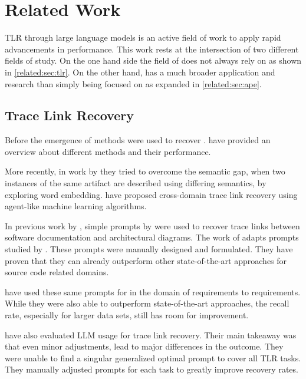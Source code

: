 \chapter{Related Work}
\Acl{TLR} through large language models is an active field of work to apply rapid advancements in \LLM performance.
This work rests at the intersection of two different fields of study.
On the one hand side the field of \TLR does not always rely on \LLMs as shown in \autoref{related:sec:tlr}.
On the other hand, \APE has a much broader application and research than simply being focused on \TLR as expanded in \autoref{related:sec:ape}.


\section{Trace Link Recovery}
\label{related:sec:tlr}

Before the emergence of \LLMs \IR methods were used to recover \TLs.
 have provided an overview about different \IR methods and their performance. 

More recently, in work by  they tried to overcome the semantic gap, when two instances of the same artifact are described using differing semantics, by exploring word embedding.
 have proposed cross-domain trace link recovery using agent-like machine learning algorithms. 



In previous work by , simple prompts by  were used to recover trace links between software documentation and architectural diagrams.
The work of \citeauthor{ewald2024RetrievalAugmentedLarge} adapts prompts studied by .
These prompts were manually designed and formulated.
They have proven that they can already outperform other state-of-the-art approaches for source code related \TLR domains.

 have used these same prompts for \TLR in the domain of requirements to requirements.
While they were also able to outperform state-of-the-art approaches, the recall rate, especially for larger data sets, still has room for improvement.

 have also evaluated LLM usage for trace link recovery.
Their main takeaway was that even minor adjustments,  lead to major differences in the outcome.
They were unable to find a singular generalized optimal prompt to cover all TLR tasks.
They manually adjusted prompts for each task to greatly improve recovery rates.

